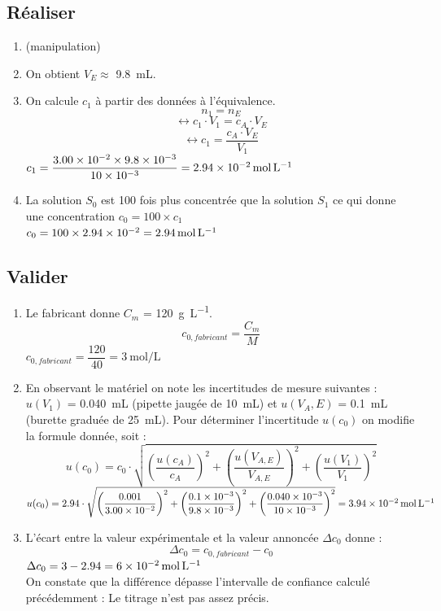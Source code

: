 \documentclass[a4paper,11pt,fleqn]{article}%
\begin{document}
\subsection{Réaliser}

\begin{enumerate}[resume]
	\item (manipulation)
	\item On obtient $V_E \approx$ \SI{9.8}{mL}. 
	\item On calcule $c_1$ à partir des données à l'équivalence. $$n_1=n_E$$ $$\leftrightarrow c_1 \cdot V_1 = c_A \cdot V_E$$ $$\leftrightarrow c_1 = \dfrac{c_A \cdot V_E}{V_1}$$ 
	 $ c_1 = \dfrac{\num{3.00E-2}\times \num{9.8E-3}}{\num{10E-3}}= \SI{2.94E-2}{\mole\per\liter}$
	\item La solution $S_0$ est 100 fois plus concentrée que la solution $S_1$ ce qui donne une concentration $c_0 = 100 \times c_1$\\
	 $c_0 = 100 \times \num{2.94E-2} = \SI{2.94}{\mole\per\liter}$
\end{enumerate}

\subsection{Valider}

 \begin{enumerate}[resume]
	\item Le fabricant donne $C_m $ = \SI{120}{\gram\per\liter}. $$c_{0, fabricant} = \dfrac{C_m}{M}$$
	 $c_{0, fabricant} = \dfrac{\num{120}}{\num{40}} = \SI{3}{\mole\per\liter}$
	\item En observant le matériel on note les incertitudes de mesure suivantes : $u(V_1)$ = \SI{0.040}{mL} (pipette jaugée de \SI{10}{mL}) et $u(V_A,E)$ = \SI{0.1}{mL} (burette graduée de \SI{25}{mL}). Pour déterminer l'incertitude $u(c_0)$ on modifie la formule donnée, soit :
	$$u(c_0) = c_0 \cdot \sqrt{\left(\frac{u(c_A)}{c_A}\right)^2+\left(\frac{u(V_{A,E})}{V_{A,E}}\right)^2+\left(\frac{u(V_1)}{V_1}\right)^2}$$
	 $u(c_0) =\num{2.94} \cdot \sqrt{\left(\dfrac{\num{0.001}}{\num{3.00E-2}}\right)^2+\left(\dfrac{\num{0.1E-3}}{\num{9.8E-3}}\right)^2+\left(\dfrac{\num{0.040E-3}}{\num{10E-3}}\right)^2} = \SI{3.94E-2}{\mole\per\liter}$
	\item L'écart entre la valeur expérimentale et la valeur annoncée $\Delta c_0$ donne : $$\Delta c_0 = c_{0,fabricant} - c_0$$
	 $\Delta c_0 = \num{3}-\num{2.94} = \SI{6E-2}{\mole\per\liter}$\\
	On constate que la différence dépasse l'intervalle de confiance calculé précédemment : Le titrage n'est pas assez précis.
\end{enumerate}
\end{document}
